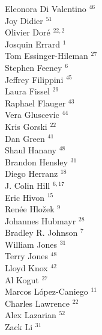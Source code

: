 \documentclass[PICOReport.tex]{subfiles}
\begin{document}
{\begin{multicols}{4}
Eleonora Di Valentino $^{46}$           \\
Joy Didier $^{51}$                      \\
Olivier Dor\'e $^{22,2}$                  \\
Josquin Errard $^{1}$                  \\
Tom Essinger-Hileman $^{27}$            \\
Stephen Feeney $^{6}$                  \\
Jeffrey Filippini $^{45}$               \\
Laura Fissel $^{29}$                    \\
Raphael Flauger $^{43}$                 \\
Vera Gluscevic $^{44}$                  \\
Kris Gorski $^{22}$                     \\
Dan Green $^{41}$                       \\
Shaul Hanany $^{48}$                    \\
Brandon Hensley $^{31}$                 \\
Diego Herranz $^{18}$                   \\
J. Colin Hill $^{6,17}$                   \\
Eric Hivon $^{15}$                      \\
Ren\'{e}e  Hlo\v{z}ek $^{9}$           \\
Johannes Hubmayr $^{28}$                \\
Bradley R. Johnson $^{7}$              \\
William Jones $^{31}$                   \\
Terry Jones $^{48}$                     \\
Lloyd Knox $^{42}$                      \\
Al Kogut $^{27}$                        \\
Marcos L\'{o}pez-Caniego $^{11}$        \\
Charles Lawrence $^{22}$                \\
Alex Lazarian $^{52}$                   \\
Zack Li $^{31}$                         \\

\end{multicols}}
\end{document}
